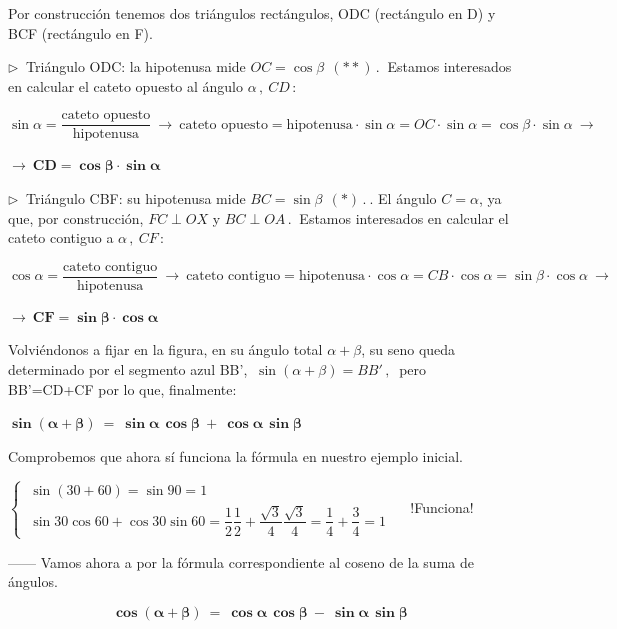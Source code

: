 Por construcción tenemos dos triángulos rectángulos, ODC (rectángulo en D) y BCF (rectángulo en F).

$\triangleright \ $ Triángulo ODC: la hipotenusa mide $OC=\cos \beta \ \ (**)\, . \ $ Estamos interesados en calcular el cateto opuesto al ángulo $\alpha\, , \ CD\, :$

$\sin \alpha=\dfrac{\text{cateto opuesto}}{\text{hipotenusa}} \ \to \ \text{cateto opuesto} =\text{hipotenusa} \cdot \sin \alpha= OC	\cdot \sin \alpha =\cos \beta \cdot \sin \alpha \ \to \ $

$\to \ \boldsymbol{CD=\cos \beta \cdot \sin \alpha}$  

$\triangleright \ $ Triángulo CBF: su hipotenusa mide $BC=\sin \beta \ \ (*)\, . \ $. El ángulo $C=\alpha$, ya que, por construcción, $FC \perp  OX$ y $BC \perp OA\,. \ $  Estamos interesados en calcular el cateto contiguo a $\alpha\, , \ CF\, :$

$\cos \alpha=\dfrac{\text{cateto contiguo}}{\text{hipotenusa}} \ \to \ \text{cateto contiguo} =\text{hipotenusa} \cdot \cos \alpha= CB \cdot \cos \alpha =\sin \beta \cdot \cos \alpha \ \to \ $

$\to \ \boldsymbol{CF=\sin \beta \cdot \cos \alpha}$  

Volviéndonos a fijar en la figura, en su ángulo total $\alpha + \beta$, su seno queda determinado por el segmento azul BB', $\ \sin(\alpha+\beta)=BB'\, , \ $ pero BB'=CD+CF por lo que, finalmente:

\vspace{5mm} \hspace{3cm} $ \boldsymbol{ \sin (\alpha + \beta) \ = \ \sin \alpha \, \cos \beta \ + \ \cos \alpha \, \sin \beta} $  \QED

Comprobemos que ahora sí funciona la fórmula en nuestro ejemplo inicial.


$\begin{cases} 
\ \sin (30+60)=\sin 90=1 \\
\ \sin 30  \cos 60 + \cos 30  \sin 60 =
\dfrac{1}{2} \dfrac{1}{2} + \dfrac{\sqrt 3}{4} \dfrac{\sqrt 3}{4}= \dfrac{1}{4}+\dfrac{3}{4}=1 \end{cases} \quad $ !Funciona!  \smiley{} 


\vspace{5mm} ------ Vamos ahora a por la fórmula correspondiente al coseno de la suma de ángulos.


\vspace{5mm}
\begin{theorem}

$$\boldsymbol{ \cos(\alpha+\beta) \ = \ \cos \alpha \, \cos \beta \ - \ \sin \alpha \, \sin \beta  }$$	
\end{theorem}

